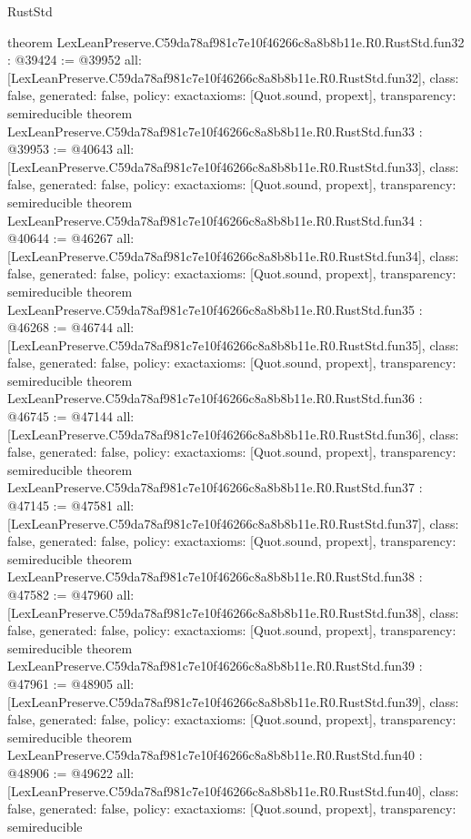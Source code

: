 \begin{lexlean}{RustStd}
\begin{coremodule}
{}
theorem LexLeanPreserve.C59da78af981c7e10f46266c8a8b8b11e.R0.RustStd.fun32 : @39424 := @39952 {
  all: [LexLeanPreserve.C59da78af981c7e10f46266c8a8b8b11e.R0.RustStd.fun32],
  class: false,
  generated: false,
  policy: exact{axioms: [Quot.sound, propext]},
  transparency: semireducible
}
theorem LexLeanPreserve.C59da78af981c7e10f46266c8a8b8b11e.R0.RustStd.fun33 : @39953 := @40643 {
  all: [LexLeanPreserve.C59da78af981c7e10f46266c8a8b8b11e.R0.RustStd.fun33],
  class: false,
  generated: false,
  policy: exact{axioms: [Quot.sound, propext]},
  transparency: semireducible
}
theorem LexLeanPreserve.C59da78af981c7e10f46266c8a8b8b11e.R0.RustStd.fun34 : @40644 := @46267 {
  all: [LexLeanPreserve.C59da78af981c7e10f46266c8a8b8b11e.R0.RustStd.fun34],
  class: false,
  generated: false,
  policy: exact{axioms: [Quot.sound, propext]},
  transparency: semireducible
}
theorem LexLeanPreserve.C59da78af981c7e10f46266c8a8b8b11e.R0.RustStd.fun35 : @46268 := @46744 {
  all: [LexLeanPreserve.C59da78af981c7e10f46266c8a8b8b11e.R0.RustStd.fun35],
  class: false,
  generated: false,
  policy: exact{axioms: [Quot.sound, propext]},
  transparency: semireducible
}
theorem LexLeanPreserve.C59da78af981c7e10f46266c8a8b8b11e.R0.RustStd.fun36 : @46745 := @47144 {
  all: [LexLeanPreserve.C59da78af981c7e10f46266c8a8b8b11e.R0.RustStd.fun36],
  class: false,
  generated: false,
  policy: exact{axioms: [Quot.sound, propext]},
  transparency: semireducible
}
theorem LexLeanPreserve.C59da78af981c7e10f46266c8a8b8b11e.R0.RustStd.fun37 : @47145 := @47581 {
  all: [LexLeanPreserve.C59da78af981c7e10f46266c8a8b8b11e.R0.RustStd.fun37],
  class: false,
  generated: false,
  policy: exact{axioms: [Quot.sound, propext]},
  transparency: semireducible
}
theorem LexLeanPreserve.C59da78af981c7e10f46266c8a8b8b11e.R0.RustStd.fun38 : @47582 := @47960 {
  all: [LexLeanPreserve.C59da78af981c7e10f46266c8a8b8b11e.R0.RustStd.fun38],
  class: false,
  generated: false,
  policy: exact{axioms: [Quot.sound, propext]},
  transparency: semireducible
}
theorem LexLeanPreserve.C59da78af981c7e10f46266c8a8b8b11e.R0.RustStd.fun39 : @47961 := @48905 {
  all: [LexLeanPreserve.C59da78af981c7e10f46266c8a8b8b11e.R0.RustStd.fun39],
  class: false,
  generated: false,
  policy: exact{axioms: [Quot.sound, propext]},
  transparency: semireducible
}
theorem LexLeanPreserve.C59da78af981c7e10f46266c8a8b8b11e.R0.RustStd.fun40 : @48906 := @49622 {
  all: [LexLeanPreserve.C59da78af981c7e10f46266c8a8b8b11e.R0.RustStd.fun40],
  class: false,
  generated: false,
  policy: exact{axioms: [Quot.sound, propext]},
  transparency: semireducible
}
\end{coremodule}
\end{lexlean}

